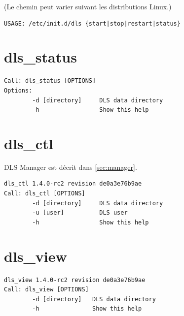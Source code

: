 \documentclass[a4paper,12pt,BCOR6mm,bibtotoc,idxtotoc]{scrbook}
\begin{document}
(Le chemin peut varier suivant les distributions Linux.)

\begin{lstlisting}
USAGE: /etc/init.d/dls {start|stop|restart|status}
\end{lstlisting}


\section{dls\_status}

\begin{lstlisting}
Call: dls_status [OPTIONS]
Options:
        -d [directory]     DLS data directory
        -h                 Show this help
\end{lstlisting}


\section{dls\_ctl}
\label{sec:apx_cmd_dlsctl}

DLS Manager est d\'ecrit dans \autoref{sec:manager}.

\begin{lstlisting}
dls_ctl 1.4.0-rc2 revision de0a3e76b9ae
Call: dls_ctl [OPTIONS]
        -d [directory]     DLS data directory
        -u [user]          DLS user
        -h                 Show this help
\end{lstlisting}


\section{dls\_view}

\begin{lstlisting}
dls_view 1.4.0-rc2 revision de0a3e76b9ae
Call: dls_view [OPTIONS]
        -d [directory]   DLS data directory
        -h               Show this help
\end{lstlisting}

\end{document}
